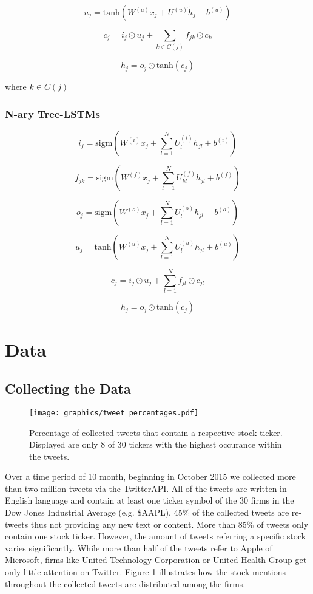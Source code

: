 \documentclass[a4paper,12pt]{article}%
\begin{document}
$$
u_j = \text{tanh} \left( W^{(u)} x_j + U^{(u)} \tilde{h}_j + b^{(u)} \right) 
$$

$$
c_j = i_j \odot u_j + \sum_{k \in C(j)} f_{jk} \odot c_k
$$

$$
h_j = o_j \odot \text{tanh}(c_j)
$$

where $k \in C(j)$

\subsubsection{N-ary Tree-LSTMs}

$$
i_j = \text{sigm} \left( W^{(i)} x_j + \sum_{l=1}^N U_l^{(i)} h_{jl} + b^{(i)} \right) 
$$

$$
f_{jk} = \text{sigm} \left( W^{(f)} x_j + \sum_{l=1}^N U_{kl}^{(f)} h_{jl} + b^{(f)} \right) 
$$

$$
o_j = \text{sigm} \left( W^{(o)} x_j + \sum_{l=1}^N U_{l}^{(o)} h_{jl} + b^{(o)} \right) 
$$

$$
u_j = \text{tanh} \left( W^{(u)} x_j +\sum_{l=1}^N U_{l}^{(u)} h_{jl} + b^{(u)} \right)
$$

$$
c_j = i_j \odot u_j + \sum_{l=1}^N f_{jl} \odot c_{jl}
$$

$$
h_j = o_j \odot \text{tanh}(c_j)
$$

\section{Data}
\subsection{Collecting the Data}
\begin{figure}
\captionsetup{justification=centering}
\centering
\texttt{[image: graphics/tweet\_percentages.pdf]}
\caption{Percentage of collected tweets that contain a respective stock ticker. Displayed are only 8 of 30 tickers with the highest occurance within the tweets. \label{fig:tweet_percentages}}
\end{figure}

Over a time period of 10 month, beginning in October 2015 we collected more than two million tweets via the TwitterAPI. All of the tweets are written in English language and contain at least one ticker symbol of the 30 firms in the Dow Jones Industrial Average (e.g. \$AAPL). 45\% of the collected tweets are re-tweets thus not providing any new text or content. More than 85\% of tweets only contain one stock ticker. However, the amount of tweets referring a specific stock varies significantly. While  more than half of the tweets refer to Apple of Microsoft, firms like United Technology Corporation or United Health Group get only little attention on Twitter. Figure \ref{fig:tweet_percentages} illustrates how the stock mentions throughout the collected tweets are distributed among the firms.
\end{document}
